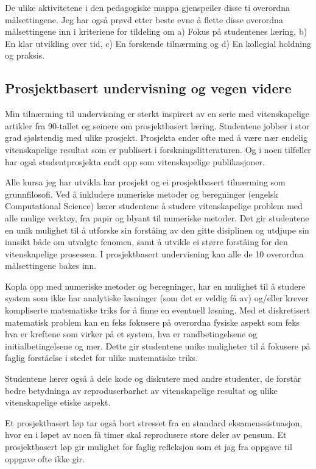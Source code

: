 \documentclass[aps,floatfix,preprint]{revtex4-1}
\begin{document}
De ulike aktivitetene i den pedagogiske mappa gjenspeiler 
disse ti overordna målsettingene. Jeg har også prøvd etter beste evne å flette disse overordna målsettingene inn i 
kriteriene for tildeling om a) Fokus på studentenes læring, b) En klar utvikling over tid, c) En forskende tilnærming
og d) En kollegial holdning og praksis.


\subsection*{Prosjektbasert undervisning og vegen videre}

Min tilnærming til undervisning er sterkt inspirert av en serie med
vitenskapelige artikler fra 90-tallet og seinere om prosjektbasert
læring. Studentene jobber i stor grad sjølstendig med ulike
prosjekt. Prosjekta ender ofte med å være nær endelig vitenskapelige
resultat som er publisert i forskningslitteraturen. Og i noen
tilfeller har også studentprosjekta endt opp som vitenskapelige
publikasjoner. 

Alle kursa jeg har utvikla har prosjekt og ei prosjektbasert
tilnærming som grunnfilosofi. Ved å inkludere numeriske metoder og
beregninger (engelsk Computational Science) lærer studentene å studere
vitenskapelige problem med alle mulige verktøy, fra papir og blyant
til numeriske metoder. Det gir studentene en unik mulighet til å
utforske sin forståing av den gitte disiplinen og utdjupe sin innsikt
både om utvalgte fenomen, samt å utvikle ei større forståing for den
vitenskapelige prosessen. I prosjektbasert undervisning kan alle de 10
overordna målsettingene bakes inn.

Kopla opp med numeriske metoder og beregninger, har en mulighet til å
studere system som ikke har analytiske løsninger (som det er veldig
få av) og/eller krever kompliserte matematiske triks for å finne en
eventuell løsning. Med et diskretisert matematisk problem kan en feks
fokusere på overordna fysiske aspekt som feks hva er kreftene som
virker på et system, hva er randbetingelsene og initialbetingelsene og mer.
Dette gir studentene unike muligheter til å fokusere på faglig forståelse i stedet for  ulike matematiske triks. 

Studentene lærer også å dele kode og diskutere med andre studenter, de forstår bedre betydninga av reproduserbarhet 
av vitenskapelige resultat og ulike vitenskapelige etiske aspekt.

Et prosjektbasert løp tar også bort stresset fra en standard
eksamenssistuasjon, hvor en i løpet av noen få timer skal reprodusere
store deler av pensum. Et prosjektbasert løp gir mulighet for faglig
refleksjon som et jag fra oppgave til oppgave ofte ikke gir.
\end{document}
